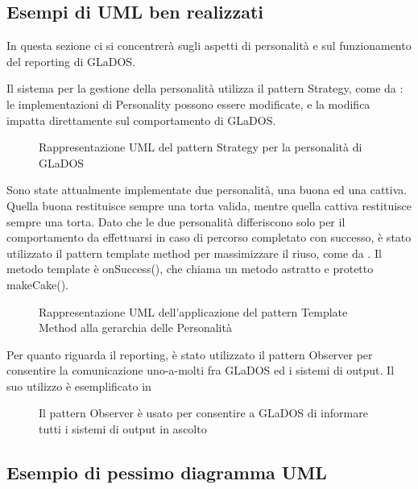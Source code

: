 \documentclass[a4paper,12pt]{report}
\begin{document}
\subsection*{Esempi di UML ben realizzati}

In questa sezione ci si concentrerà sugli aspetti di personalità e sul funzionamento del reporting di GLaDOS.

Il sistema per la gestione della personalità utilizza il pattern Strategy, come da : le implementazioni di Personality possono essere modificate, e la modifica impatta direttamente sul comportamento di GLaDOS.

\begin{figure}
\centering{}
\caption{Rappresentazione UML del pattern Strategy per la personalità di GLaDOS}
\label{img:strategy}
\end{figure}

Sono state attualmente implementate due personalità, una buona ed una cattiva.
Quella buona restituisce sempre una torta valida, mentre quella cattiva restituisce sempre una torta.
Dato che le due personalità differiscono solo per il comportamento da effettuarsi in caso di percorso completato con successo, è stato utilizzato il pattern template method per massimizzare il riuso, come da .
Il metodo template è onSuccess(), che chiama un metodo astratto e protetto makeCake().

\begin{figure}
\centering{}
\caption{Rappresentazione UML dell'applicazione del pattern Template Method alla gerarchia delle Personalità}
\label{img:template}
\end{figure}

Per quanto riguarda il reporting, è stato utilizzato il pattern Observer per consentire la comunicazione uno-a-molti fra GLaDOS ed i sistemi di output.
Il suo utilizzo è esemplificato in 

\begin{figure}
\centering{}
\caption{Il pattern Observer è usato per consentire a GLaDOS di informare tutti i sistemi di output in ascolto}
\label{img:observer}
\end{figure}

\subsection*{Esempio di pessimo diagramma UML}
\end{document}
